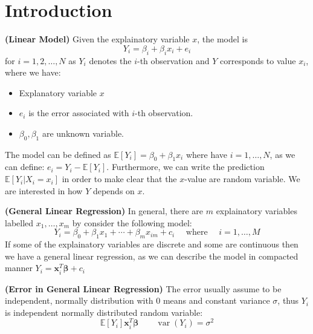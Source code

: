 
\section{Introduction}

\begin{definition}{\textbf{(Linear Model)}}
    Given the explainatory variable $x$, the model is 
    \begin{equation*}
        Y_i = \beta_i + \beta_ix_i + e_i
    \end{equation*}
    for $i=1,2,\dots,N$ as $Y_i$ denotes the $i$-th observation and $Y$ corresponds to value $x_i$, where we have:
    \begin{itemize}
        \item Explanatory variable $x$
        \item $e_i$ is the error associated with $i$-th observation. 
        \item $\beta_0, \beta_1$ are unknown variable. 
    \end{itemize}
    The model can be defined as $\mathbb{E}[Y_i] = \beta_0 + \beta_1 x_i$ where have $i=1,\dots,N$, as we can define: $e_i = Y_i - \mathbb{E}[Y_i]$. Furthermore, we can write the prediction $\mathbb{E}[Y_i | X_i = x_i]$ in order to make clear that the $x$-value are random variable. We are interested in how $Y$ depends on $x$.
\end{definition}

\begin{remark}{\textbf{(General Linear Regression)}}
    In general, there are $m$ explainatory variables labelled $x_1, \dots, x_m$ by consider the following model:
    \begin{equation*}
        Y_i = \beta_0 + \beta_1x_1 + \cdots + \beta_mx_{im} + c_i \quad \text{ where } \quad i = 1,\dots, M
    \end{equation*}
    If some of the explainatory variables are discrete and some are continuous then we have a general linear regression, as we can describe the model in compacted manner $Y_i = \boldsymbol x_i^T\boldsymbol \beta + c_i$
\end{remark}

\begin{remark}{\textbf{(Error in General Linear Regression)}}
    The error usually assume to be independent, normally distribution with $0$ means and constant variance $\sigma$, thus $Y_i$ is independent normally distributed random variable:
    \begin{equation*}
        \mathbb{E}[Y_i] \boldsymbol x_i^T\boldsymbol \beta \qquad \operatorname{var}(Y_i) = \sigma^2
    \end{equation*}
\end{remark}

